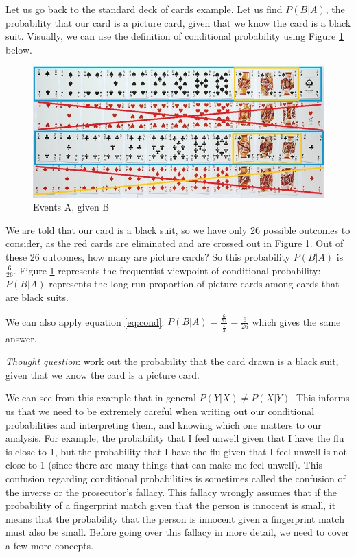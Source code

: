 \documentclass[
]{book}
\begin{document}
Let us go back to the standard deck of cards example. Let us find \(P(B|A)\), the probability that our card is a picture card, given that we know the card is a black suit. Visually, we can use the definition of conditional probability using Figure \ref{fig:cardscond} below.

\begin{figure}
\centering
\includegraphics{images/02-cardscond.jpg}
\caption{\label{fig:cardscond}Events A, given B}
\end{figure}

We are told that our card is a black suit, so we have only 26 possible outcomes to consider, as the red cards are eliminated and are crossed out in Figure \ref{fig:cardscond}. Out of these 26 outcomes, how many are picture cards? So this probability \(P(B|A)\) is \(\frac{6}{26}\). Figure \ref{fig:cardscond} represents the frequentist viewpoint of conditional probability: \(P(B|A)\) represents the long run proportion of picture cards among cards that are black suits.

We can also apply equation \eqref{eq:cond}: \(P(B|A) = \frac{\frac{6}{52}}{\frac{1}{2}} = \frac{6}{26}\) which gives the same answer.

\emph{Thought question}: work out the probability that the card drawn is a black suit, given that we know the card is a picture card.

We can see from this example that in general \(P(Y|X) \neq P(X|Y)\). This informs us that we need to be extremely careful when writing out our conditional probabilities and interpreting them, and knowing which one matters to our analysis. For example, the probability that I feel unwell given that I have the flu is close to 1, but the probability that I have the flu given that I feel unwell is not close to 1 (since there are many things that can make me feel unwell). This confusion regarding conditional probabilities is sometimes called the confusion of the inverse or the prosecutor's fallacy. This fallacy wrongly assumes that if the probability of a fingerprint match given that the person is innocent is small, it means that the probability that the person is innocent given a fingerprint match must also be small. Before going over this fallacy in more detail, we need to cover a few more concepts.
\end{document}
